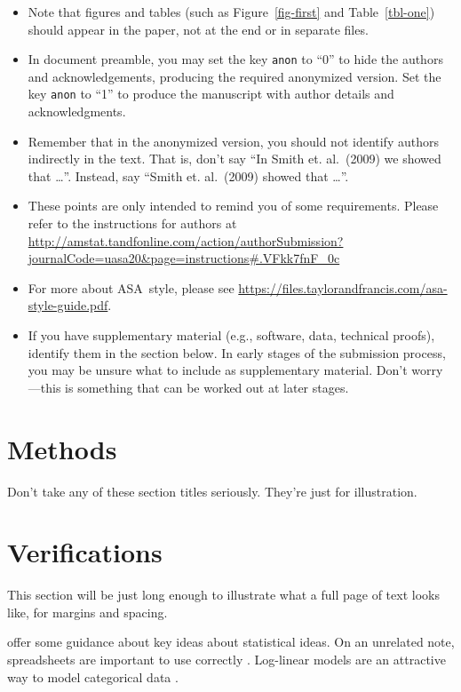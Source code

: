 \documentclass[
  12pt]{article}
\providecommand{\tightlist}{%
  \setlength{\itemsep}{0pt}\setlength{\parskip}{0pt}}\usepackage{longtable,booktabs,array}
\begin{document}
\begin{itemize}
\tightlist
\item
  Note that figures and tables (such as Figure~\ref{fig-first} and
  Table~\ref{tbl-one}) should appear in the paper, not at the end or in
  separate files.
\item
  In document preamble, you may set the key \texttt{anon} to ``0'' to hide the authors and acknowledgements,
  producing the required anonymized version. Set the key \texttt{anon} to ``1'' to produce the manuscript with author details and acknowledgments.
\item
  Remember that in the anonymized version, you should not identify
  authors indirectly in the text. That is, don't say ``In Smith et.
  al.~(2009) we showed that \ldots{}''. Instead, say ``Smith et.
  al.~(2009) showed that \ldots{}''.
\item
  These points are only intended to remind you of some requirements.
  Please refer to the instructions for authors at
  \url{http://amstat.tandfonline.com/action/authorSubmission?journalCode=uasa20&page=instructions\#.VFkk7fnF_0c}
\item
  For more about ASA~style, please see
  \url{https://files.taylorandfrancis.com/asa-style-guide.pdf}.
\item
  If you have supplementary material (e.g., software, data, technical
  proofs), identify them in the section below. In early stages of the
  submission process, you may be unsure what to include as supplementary
  material. Don't worry---this is something that can be worked out at
  later stages.
\end{itemize}

\section{Methods}\label{sec-meth}

Don't take any of these section titles seriously. They're just for
illustration.

\section{Verifications}\label{sec-verify}

This section will be just long enough to illustrate what a full page of
text looks like, for margins and spacing.

\addtolength{\textheight}{.5in}%

\citet{gelm:veht:2021} offer some guidance about key ideas about
statistical ideas. On an unrelated note, spreadsheets are important to
use correctly \citep{brom:woo:2018}. Log-linear models are an attractive
way to model categorical data \citep{bish:fien:1975}.
\end{document}
